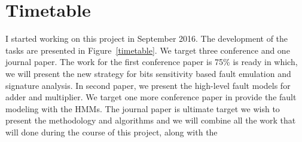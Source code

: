 \section{Timetable}



I started working on this project in September 2016. 
The development of the tasks are presented in Figure~\ref{timetable}. We target three conference and one journal paper. The work for the first conference paper is 75\% is ready in which, we will present the new strategy for bits sensitivity based fault emulation and signature analysis. In second paper, we present the high-level fault models for adder and multiplier. We target one more conference paper in provide the fault modeling with the HMMs.  The journal paper is ultimate target we wish to present the methodology and algorithms and we will combine all the work that will done during the course of this project, along with the 


